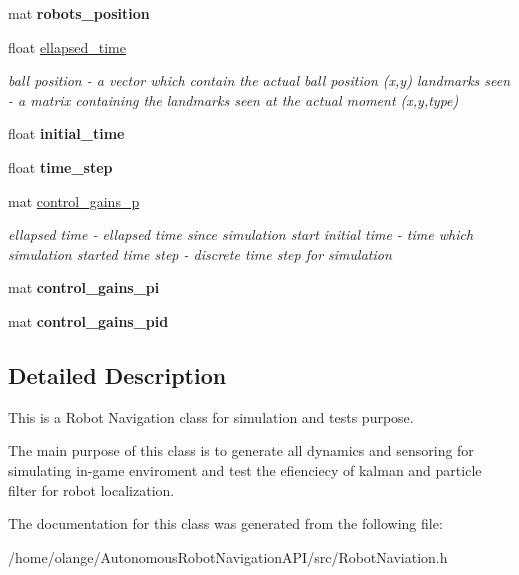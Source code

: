 \begin{DoxyCompactItemize}
mat {\bfseries robots\+\_\+position}
\item 
\mbox{\label{class_robot_navigation_a4ccd950c2d302318d4635263096bc977}} 
float \hyperlink{class_robot_navigation_a4ccd950c2d302318d4635263096bc977}{ellapsed\+\_\+time}
\begin{DoxyCompactList}\small\item\em ball position -\/ a vector which contain the actual ball position (x,y) landmarks seen -\/ a matrix containing the landmarks seen at the actual moment (x,y,type) \end{DoxyCompactList}\item 
\mbox{\label{class_robot_navigation_a0aefa2162f9e8911625c977b134cd333}} 
float {\bfseries initial\+\_\+time}
\item 
\mbox{\label{class_robot_navigation_a1f1de08123eaff99571bb21fa411d4dd}} 
float {\bfseries time\+\_\+step}
\item 
\mbox{\label{class_robot_navigation_ad7ff88f46b33d23be62fc365b650361e}} 
mat \hyperlink{class_robot_navigation_ad7ff88f46b33d23be62fc365b650361e}{control\+\_\+gains\+\_\+p}
\begin{DoxyCompactList}\small\item\em ellapsed time -\/ ellapsed time since simulation start initial time -\/ time which simulation started time step -\/ discrete time step for simulation \end{DoxyCompactList}\item 
\mbox{\label{class_robot_navigation_a90738c7f4f1a884edce67e44769b284b}} 
mat {\bfseries control\+\_\+gains\+\_\+pi}
\item 
\mbox{\label{class_robot_navigation_a0f450c83221af7ef3e276b65ebfdc50d}} 
mat {\bfseries control\+\_\+gains\+\_\+pid}
\end{DoxyCompactItemize}


\subsection{Detailed Description}
This is a Robot Navigation class for simulation and tests purpose. 

The main purpose of this class is to generate all dynamics and sensoring for simulating in-\/game enviroment and test the efienciecy of kalman and particle filter for robot localization. 

The documentation for this class was generated from the following file\+:\begin{DoxyCompactItemize}
\item 
/home/olange/\+Autonomous\+Robot\+Navigation\+A\+P\+I/src/Robot\+Naviation.\+h\end{DoxyCompactItemize}
